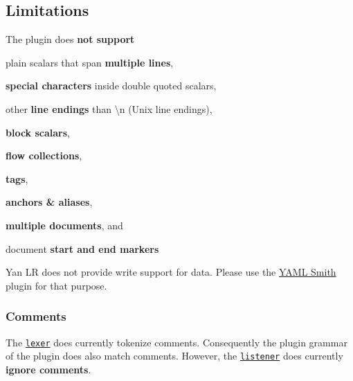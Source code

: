 \subsection*{Limitations}


\begin{DoxyItemize}
\item The plugin does {\bfseries not support}
\begin{DoxyItemize}
\item plain scalars that span {\bfseries multiple lines},
\item {\bfseries special characters} inside double quoted scalars,
\item other {\bfseries line endings} than {\ttfamily \textbackslash{}n} (Unix line endings),
\item {\bfseries block scalars},
\item {\bfseries flow collections},
\item {\bfseries tags},
\item {\bfseries anchors \& aliases},
\item {\bfseries multiple documents}, and
\item document {\bfseries start and end markers}
\end{DoxyItemize}
\item Yan LR does not provide write support for data. Please use the \hyperlink{md_src_plugins_yamlsmith_README_src_plugins_yamlsmith_README_md}{Y\+A\+ML Smith} plugin for that purpose.
\end{DoxyItemize}

\subsubsection*{Comments}

The \href{/home/markus/Projekte/Elektra/current/src/plugins/yanlr/yaml_lexer.cpp}{\tt lexer} does currently tokenize comments. Consequently the plugin grammar of the plugin does also match comments. However, the \href{/home/markus/Projekte/Elektra/current/src/plugins/yanlr/listener.cpp}{\tt listener} does currently {\bfseries ignore comments}. 